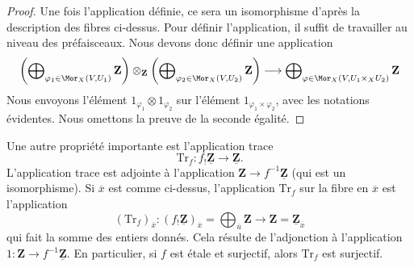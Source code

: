 \begin{proof}
Une fois l'application définie, ce sera un isomorphisme d'après la description
des fibres ci-dessus. Pour définir l'application, il suffit de travailler au niveau
des préfaisceaux. Nous devons donc définir une application
$$
\left(\bigoplus\nolimits_{\varphi_1 \in \Mor_X(V, U_1)} \mathbf{Z}\right)
\otimes_{\mathbf{Z}}
\left(\bigoplus\nolimits_{\varphi_2 \in \Mor_X(V, U_2)} \mathbf{Z}\right)
\longrightarrow
\bigoplus\nolimits_{\varphi \in \Mor_X(V, U_1 \times_X U_2)}
\mathbf{Z}
$$
Nous envoyons l'élément $1_{\varphi_1} \otimes 1_{\varphi_2}$ sur l'élément
$1_{\varphi_1 \times \varphi_2}$, avec les notations évidentes. Nous omettons la preuve
de la seconde égalité.
\end{proof}

\noindent
Une autre propriété importante est l'application trace
$$
\text{Tr}_f : f_!\underline{\mathbf{Z}} \longrightarrow \underline{\mathbf{Z}}.
$$
L'application trace est adjointe à
l'application $\mathbf{Z} \to f^{-1}\underline{\mathbf{Z}}$ (qui est un isomorphisme).
Si $\overline{x}$ est comme ci-dessus, l'application $\text{Tr}_f$ sur la fibre en $\overline{x}$
est l'application
$$
(\text{Tr}_f)_{\overline{x}} :
(f_!\underline{\mathbf{Z}})_{\overline{x}} =
\bigoplus\nolimits_{\overline{u}} \mathbf{Z}
\longrightarrow
\mathbf{Z} = \underline{\mathbf{Z}}_{\overline{x}}
$$
qui fait la somme des entiers donnés. Cela résulte de l'adjonction à l'application
$1 : \mathbf{Z} \to f^{-1}\underline{\mathbf{Z}}$. En particulier, si
$f$ est étale et surjectif, alors $\text{Tr}_f$ est surjectif.

